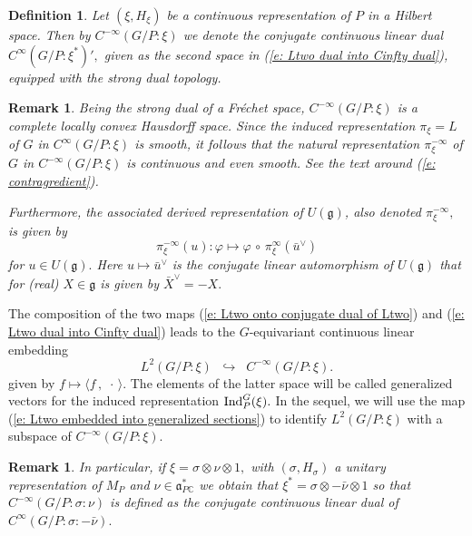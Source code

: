 \documentclass[12pt,a4paper]{article}
\newtheorem{Defi}[Thm]{Definition}
\newtheorem{Rem}[Thm]{Remark}
\newenvironment{defi}[0]{\begin{Defi}\noindent\rm}%
{\end{Defi}}
\newenvironment{rem}[0]{\begin{Rem}\noindent\rm}%
{\end{Rem}}
\def\msy#1{{\mathbb #1}}
\def\C{{\msy C}}
\def\gf{\varphi}
\def\gs{\sigma}
\def\got#1{\mathfrak #1}
\def\fa{{\got a}}
\def\fg{{\got g}}
\def\inp#1#2{\langle#1\,,\,#2\rangle}
\def\after{\,{\scriptstyle\circ}\,}
\def\iC{{\scriptscriptstyle \C}}
\numberwithin{Thm}{section}
\numberwithin{equation}{section}
\def\Ind{{\rm Ind}}
\def\dotvar{\, \cdot\,}
\def\embeds{\hookrightarrow}
\def\faPdc{{\fa_{P\iC}^*}}
\numberwithin{equation}{section}
\def\faPdc{\fa_{P\iC}^*}
\def\veec{\vee}%
\begin{document}
\begin{defi}
\label{d: defi generalized vectors induced}
Let $(\xi, H_\xi)$ be a continuous representation of $P$ in a Hilbert space. 
Then by 
$C^{-\infty}( G/P: \xi)$ we denote the conjugate continuous linear dual  
$C^{\infty} (G/P: \xi^*){}',$ given as the second space in (\ref{e: Ltwo dual into Cinfty dual}),
equipped with the strong dual  topology. 
\end{defi}

\begin{rem}
Being the strong dual of a Fr\'echet space, $C^{-\infty}(G/P:\xi)$ 
is a complete locally convex Hausdorff space. Since the induced representation 
$\pi_\xi = L$ of $G$ in $C^\infty(G/P:\xi)$ is smooth, it follows that 
the natural representation  $\pi^{-\infty}_\xi$ 
of $G$ in $C^{-\infty}(G/P:\xi)$ is continuous and even smooth. 
See the text around (\ref{e: contragredient}).

Furthermore, the associated derived representation of $U(\fg)$, 
also denoted $\pi^{-\infty}_\xi,$ is given by 
$$ 
\pi^{-\infty}_\xi(u): \gf\mapsto \gf \after \pi^{\infty}_\xi(\bar u^\veec)
$$%
for $u \in U(\fg).$ Here  $u \mapsto \bar u^\veec$ is the conjugate linear automorphism
of $U(\fg)$ that for (real) $X \in \fg$ is given by $\bar X^\veec = - X.$ 
\end{rem}

 The composition of the two maps (\ref{e: Ltwo onto conjugate dual of Ltwo}) 
 and (\ref{e: Ltwo dual into Cinfty dual}) leads to 
 the $G$-equivariant continuous linear embedding 
\begin{equation}
\label{e: Ltwo embedded into generalized sections}
L^2(G/ P : \xi) \;\; \embeds \;\;  C^{-\infty}(G/ P : \xi).
\end{equation} 
given by $f \mapsto \inp{f}{\dotvar}.$ The elements
of the latter space will be called generalized vectors for the induced representation $\Ind_P^G(\xi).$ 
In the sequel, we will use the map (\ref{e: Ltwo embedded into generalized sections})
to identify $L^2(G/P:\xi)$ with a subspace of $C^{-\infty}(G/P:\xi).$ 

\begin{rem}
\label{r: dual of gs otimes nu} 
In particular, if $\xi = \gs \otimes \nu \otimes 1,$ with $(\gs, H_\gs)$ a unitary representation of $M_P$ and $\nu \in \faPdc$ we obtain that 
$\xi^* = \gs \otimes -\bar\nu \otimes  1$ so that $C^{-\infty}(G/P: \gs : \nu)$ is defined as the conjugate continuous 
linear dual of $C^\infty(G/P: \gs :  -\bar\nu).$ 
\end{rem}
\end{document}
